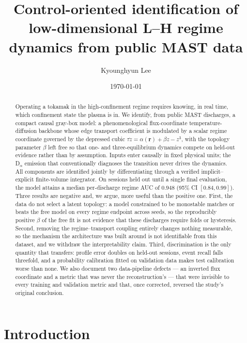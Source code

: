 \documentclass[11pt]{article}
\title{Control-oriented identification of low-dimensional L--H regime\\
dynamics from public MAST data}
\author{Kyounghyun Lee}
\date{\today}
\newcommand{\lat}{z}
\newcommand{\dr}{\alpha}
\newcommand{\inr}{\bm{r}}
\begin{document}
\maketitle

\begin{abstract}
Operating a tokamak in the high-confinement regime requires knowing, in real
time, which confinement state the plasma is in. We identify, from \nShots{}
public MAST discharges, a compact causal gray-box model: a phenomenological
flux-coordinate temperature-diffusion backbone whose edge transport
coefficient is modulated by a scalar regime coordinate governed by the
depressed cubic $\tau\dot\lat = \dr(\inr) + \beta\lat - \lat^{3}$, with the
topology parameter $\beta$ left free so that one- and three-equilibrium
dynamics compete on held-out evidence rather than by assumption. Inputs
enter causally in fixed physical units; the D$_\alpha$ emission that
conventionally diagnoses the transition never drives the dynamics. All
components are identified jointly by differentiating through a verified
implicit--explicit finite-volume integrator. On sessions held out until a
single final evaluation, the model attains a median per-discharge regime
AUC of $0.948$ (95\% CI $[0.84, 0.99]$). Three results are negative and, we
argue, more useful than the positive one. First, the data do not select a
latent topology: a model constrained to be monostable matches or beats the
free model on every regime endpoint across seeds, so the reproducibly
positive $\beta$ of the free fit is not evidence that these discharges
require folds or hysteresis. Second, removing the regime--transport coupling
entirely changes nothing measurable, so the mechanism the architecture was
built around is not identifiable from this dataset, and we withdraw the
interpretability claim. Third, discrimination is the only quantity that
transfers: profile error doubles on held-out sessions, event recall falls
threefold, and a probability calibration fitted on validation data makes
test calibration worse than none. We also document two data-pipeline defects
--- an inverted flux coordinate and a metric that was never the
reconstruction's --- that were invisible to every training and validation
metric and that, once corrected, reversed the study's original conclusion.
\end{abstract}

\section{Introduction}
\label{sec:intro}
\end{document}
